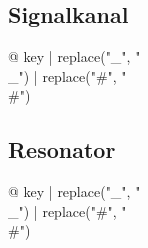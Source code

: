 \begin{multicols}{2}
\subsection{Signalkanal}

\begin{description}
\item[{@ key | replace("_", "\\_") | replace("#", "\\#") }] %
\end{description}

\subsection{Resonator}

\begin{description}
\item[{@ key | replace("_", "\\_") | replace("#", "\\#") }] %
\end{description}

\end{multicols}